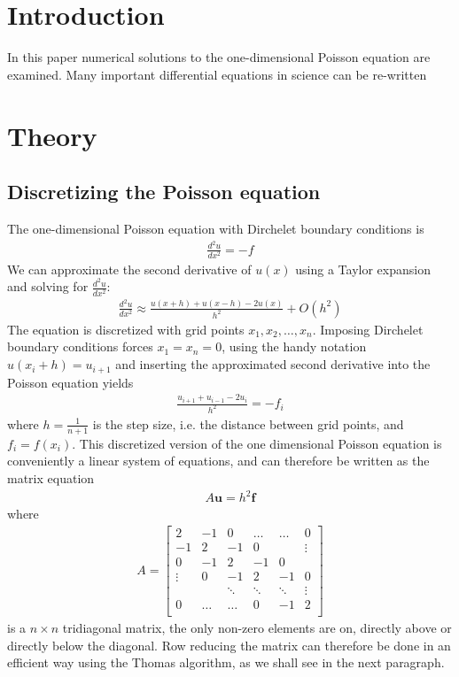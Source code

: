 \documentclass[aps,prl,reprint,toc]{revtex4-1}
\begin{document}
\section{Introduction}
In this paper numerical solutions to the one-dimensional Poisson equation are
examined. Many important differential equations in science can be re-written  

\section{Theory}
\subsection{Discretizing the Poisson equation}
The one-dimensional Poisson equation with Dirchelet boundary conditions is
\begin{align*}
  \frac{d^2 u}{d x^2} = - f
\end{align*}
We can approximate the second derivative of $u(x)$ using a Taylor expansion
and solving for $\frac{d^2 u}{d x^2}$:
\begin{align*}
  \frac{d^2 u}{d x^2} \approx \frac{u(x+h) + u(x-h) - 2 u(x)}{h^2} + O(h^2)
\end{align*}
The equation is discretized with grid points $x_1, x_2, \hdots, x_{n}$. Imposing
Dirchelet boundary conditions forces $x_1 = x_n = 0$, using the handy notation
$u(x_i + h) = u_{i+1}$ and inserting the approximated second derivative into the
Poisson equation yields
\begin{align*}
  \frac{u_{i+1} + u_{i-1} - 2 u_i}{h^2} = -f_i
\end{align*}
where $h = \frac{1}{n+1}$ is the step size, i.e. the distance between grid points, and
$f_i = f(x_i)$. This discretized version of the one dimensional Poisson equation is
conveniently a linear system of equations, and can therefore be written
as the matrix equation
\begin{align*}
  A \mathbf{u} = h^2 \mathbf{f}
\end{align*}
where
\begin{align*}
  A =
  \begin{bmatrix}
    2 & -1 & 0  & \hdots & \hdots &   0    \\
    -1 & 2 & -1 & 0      & &\vdots \\
    0 & -1 & 2  & -1     & 0 &  \\
    \vdots & 0 & -1  & 2     & -1 & 0 \\
    & & \ddots & \ddots & \ddots & \vdots\\
    0 & \hdots  &\hdots & 0 &-1 & 2 \\
\end{bmatrix}
\end{align*}
is a $n \times n$ tridiagonal matrix, the only non-zero elements are on,
directly above or directly below the diagonal. Row reducing the matrix can therefore
be done in an efficient way using the Thomas algorithm, as we shall see in the next paragraph.
\end{document}
